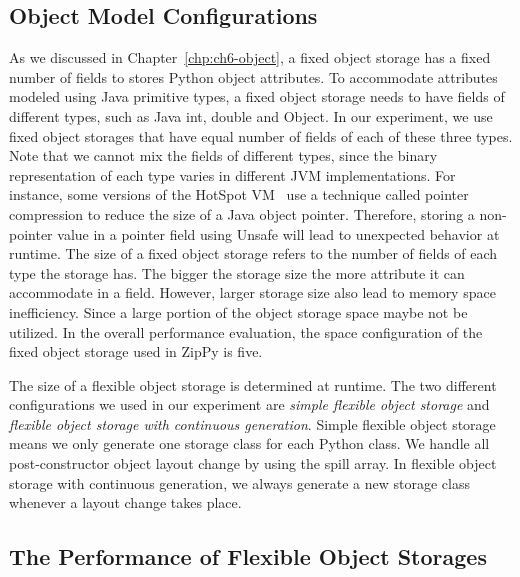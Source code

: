\subsection{Object Model Configurations}

As we discussed in Chapter~\ref{chp:ch6-object}, a fixed object storage has a fixed number of fields to stores Python object attributes.
To accommodate attributes modeled using Java primitive types, a fixed object storage needs to have fields of different types, such as Java \textsf{int}, \textsf{double} and \textsf{Object}.
In our experiment, we use fixed object storages that have equal number of fields of each of these three types.
Note that we cannot mix the fields of different types, since the binary representation of each type varies in different JVM implementations.
For instance, some versions of the HotSpot VM~\cite{hotspot} use a technique called pointer compression to reduce the size of a Java object pointer.
Therefore, storing a non-pointer value in a pointer field using \textsf{Unsafe} will lead to unexpected behavior at runtime.
The size of a fixed object storage refers to the number of fields of each type the storage has.
The bigger the storage size the more attribute it can accommodate in a field.
However, larger storage size also lead to memory space inefficiency.
Since a large portion of the object storage space maybe not be utilized.
In the overall performance evaluation, the space configuration of the fixed object storage used in ZipPy is five.

The size of a flexible object storage is determined at runtime.
The two different configurations we used in our experiment are \emph{simple flexible object storage} and \emph{flexible object storage with continuous generation}.
Simple flexible object storage means we only generate one storage class for each Python class.
We handle all post-constructor object layout change by using the spill array.
In flexible object storage with continuous generation, we always generate a new storage class whenever a layout change takes place.

\subsection{The Performance of Flexible Object Storages}

